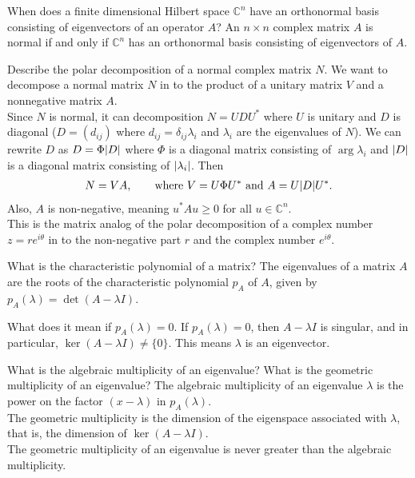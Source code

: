 \documentclass[avery5388,grid,frame]{flashcards}
\def\Cx{\mathbb{C}}
\begin{document}
\begin{flashcard}
    {When does a finite dimensional Hilbert space $\Cx^n$ have an orthonormal basis consisting of eigenvectors of an operator $A$?}
    An $n\times n$ complex matrix $A$ is normal if and only if $\Cx^n$ has an orthonormal basis consisting of eigenvectors of $A$.
\end{flashcard}

\begin{flashcard}
    {Describe the polar decomposition of a normal complex matrix $N$.}
    We want to decompose a normal matrix $N$ in to the product of a unitary matrix $V$ and a nonnegative matrix $A$. \\

    Since $N$ is normal, it can decomposition $N = UDU^*$ where $U$ is unitary and $D$ is diagonal ($D = (d_{ij})$ where $d_{ij} = \delta_{ij}\lambda_i$ and $\lambda_i$ are the eigenvalues of $N$).  We can rewrite $D$ as $D = \Phi\abs{D}$ where $\Phi$ is a diagonal matrix consisting of $\arg{\lambda_i}$ and $\abs{D}$ is a diagonal matrix consisting of $\abs{\lambda_i}$.  Then
    \begin{align*}
        N = VA, \qquad \text{where } V = U\Phi U^*\ \text{and}\ A = U\abs{D}U^*.
    \end{align*}
    Also, $A$ is non-negative, meaning $u^*Au \geq 0$ for all $u \in \Cx^n$. \\

    This is the matrix analog of the polar decomposition of a complex number $z = r e^{i\theta}$ in to the non-negative part $r$ and the complex number $e^{i\theta}$.
\end{flashcard}

\begin{flashcard}
    {What is the characteristic polynomial of a matrix?}
    The eigenvalues of a matrix $A$ are the roots of the characteristic polynomial $p_A$ of $A$, given by $p_A(\lambda) = \det(A - \lambda I)$.
\end{flashcard}

\begin{flashcard}
    {What does it mean if $p_A(\lambda) = 0$.}
    If $p_A(\lambda) = 0$, then $A - \lambda I$ is singular, and in particular, $\ker (A - \lambda I) \neq \{0\}$.  This means $\lambda$ is an eigenvector.
\end{flashcard}

\begin{flashcard}
    {What is the algebraic multiplicity of an eigenvalue?  What is the geometric multiplicity of an eigenvalue?}
    The algebraic multiplicity of an eigenvalue $\lambda$ is the power on the factor $(x - \lambda)$ in $p_A(\lambda)$. \\

    The geometric multiplicity is the dimension of the eigenspace associated with $\lambda$, that is, the dimension of $\ker (A - \lambda I)$. \\

    The geometric multiplicity of an eigenvalue is never greater than the algebraic multiplicity.
\end{flashcard}
\end{document}
